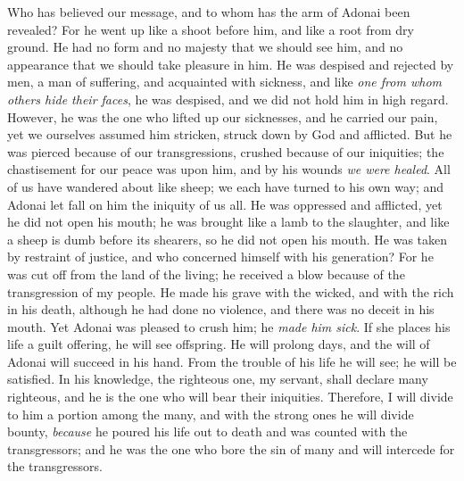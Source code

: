 \begin{biblechapter} %
\verse Who has believed our message, 
and to whom has the arm of Adonai been revealed?
\verse For he went up like a shoot before him, 
and like a root from dry ground. 
He had no form and no majesty that we should see him, 
and no appearance that we should take pleasure in him.
\verse He was despised and rejected by men, 
a man of suffering, and acquainted with sickness, 
and like \textit{one from whom others hide their faces}, he was despised, 
and we did not hold him in high regard.
\verse However, he was the one who lifted up our sicknesses, 
and he carried our pain, 
yet we ourselves assumed him stricken, 
struck down by God and afflicted.
\verse But he was pierced because of our transgressions, 
crushed because of our iniquities; 
the chastisement for our peace was upon him, 
and by his wounds \textit{we were healed}.
\verse All of us have wandered about like sheep; 
we each have turned to his own way; 
and Adonai let fall on him 
the iniquity of us all.
\verse He was oppressed and afflicted, 
yet he did not open his mouth; 
he was brought like a lamb to the slaughter, 
and like a sheep is dumb before its shearers, 
so he did not open his mouth.
\verse He was taken by restraint of justice, 
and who concerned himself with his generation? 
For he was cut off from the land of the living; 
he received a blow because of the transgression of my people.
\verse He made his grave with the wicked, 
and with the rich in his death, 
although he had done no violence, 
and there was no deceit in his mouth.
\verse Yet Adonai was pleased to crush him; 
he \textit{made him sick}. 
If she places his life a guilt offering, 
he will see offspring. 
He will prolong days, 
and the will of Adonai will succeed in his hand.
\verse From the trouble of his life he will see; 
he will be satisfied. 
In his knowledge, the righteous one, my servant, shall declare many righteous, 
and he is the one who will bear their iniquities.
\verse Therefore, I will divide to him a portion among the many, 
and with the strong ones he will divide bounty, 
\textit{because} he poured his life out to death 
and was counted with the transgressors; 
and he was the one who bore the sin of many 
and will intercede for the transgressors.
\end{biblechapter}

